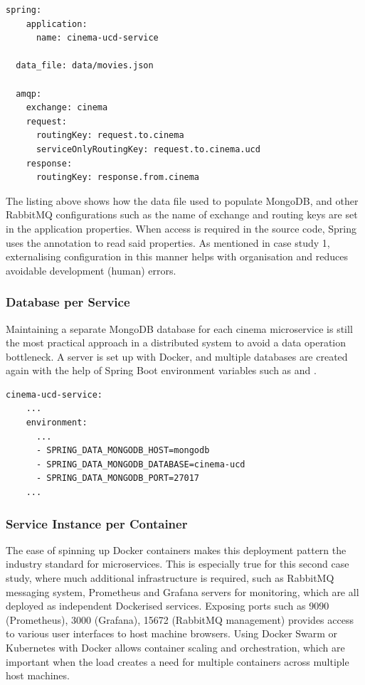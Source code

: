 \begin{lstlisting}[caption=UCD cinema's \code{application.yml}.]
  spring:
    application:
      name: cinema-ucd-service

  data_file: data/movies.json

  amqp:
    exchange: cinema
    request:
      routingKey: request.to.cinema
      serviceOnlyRoutingKey: request.to.cinema.ucd
    response:
      routingKey: response.from.cinema
\end{lstlisting}

The listing above shows how the data file used to populate MongoDB, and other RabbitMQ configurations such as the name of exchange and routing keys are set in the application properties. When access is required in the source code, Spring uses the  annotation to read said properties. As mentioned in case study 1, externalising configuration in this manner helps with organisation and reduces avoidable development (human) errors.

\subsubsection{Database per Service}

Maintaining a separate MongoDB database for each cinema microservice is still the most practical approach in a distributed system to avoid a data operation bottleneck. A server is set up with Docker, and multiple databases are created again with the help of Spring Boot environment variables such as  and .

\begin{lstlisting}[caption=Snippet from \code{docker-compose.yml} for UCD cinema.]
  cinema-ucd-service:
    ...
    environment:
      ...
      - SPRING_DATA_MONGODB_HOST=mongodb
      - SPRING_DATA_MONGODB_DATABASE=cinema-ucd
      - SPRING_DATA_MONGODB_PORT=27017
    ...
\end{lstlisting}

\subsubsection{Service Instance per Container}

The ease of spinning up Docker containers makes this deployment pattern the industry standard for microservices. This is especially true for this second case study, where much additional infrastructure is required, such as RabbitMQ messaging system, Prometheus and Grafana servers for monitoring, which are all deployed as independent Dockerised services. Exposing ports such as 9090 (Prometheus), 3000 (Grafana), 15672 (RabbitMQ management) provides access to various user interfaces to host machine browsers. Using Docker Swarm or Kubernetes with Docker allows container scaling and orchestration, which are important when the load creates a need for multiple containers across multiple host machines.

